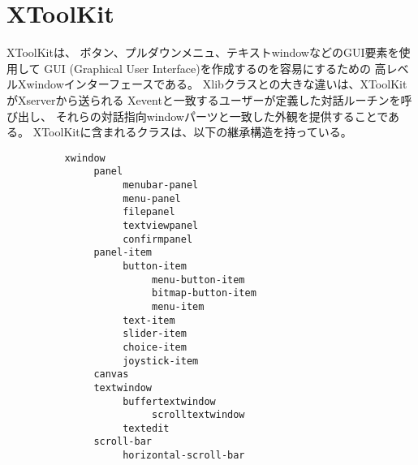 \section{XToolKit}

XToolKitは、
ボタン、プルダウンメニュ、テキストwindowなどのGUI要素を使用して
GUI (Graphical User Interface)を作成するのを容易にするための
高レベルXwindowインターフェースである。
Xlibクラスとの大きな違いは、XToolKitがXserverから送られる
Xeventと一致するユーザーが定義した対話ルーチンを呼び出し、
それらの対話指向windowパーツと一致した外観を提供することである。
XToolKitに含まれるクラスは、以下の継承構造を持っている。
\begin{verbatim}
          xwindow
               panel
                    menubar-panel
                    menu-panel
                    filepanel
                    textviewpanel
                    confirmpanel
               panel-item
                    button-item
                         menu-button-item
                         bitmap-button-item
                         menu-item
                    text-item
                    slider-item
                    choice-item
                    joystick-item
               canvas
               textwindow
                    buffertextwindow
                         scrolltextwindow
                    textedit
               scroll-bar
                    horizontal-scroll-bar
\end{verbatim}

